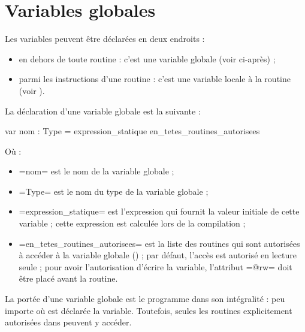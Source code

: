 




\chapter{Variables globales}

Les variables peuvent être déclarées en deux endroits :
\begin{itemize}
  \item en dehors de toute routine : c'est une variable globale (voir ci-après) ;
  \item parmi les instructions d'une routine : c'est une variable locale à la routine (voir ).
\end{itemize}






La déclaration d'une variable globale est la suivante :

\begin{PLM}
var nom : Type = expression_statique {
  en_tetes_routines_autorisees
}
\end{PLM}

Où :
\begin{itemize}
  \item \plm=nom= est le nom de la variable globale ;
  \item \plm=Type= est le nom du type de la variable globale ;
  \item \plm=expression_statique= est l'expression qui fournit la valeur initiale de cette variable ; cette expression est calculée lors de la compilation ;
  \item \plm=en_tetes_routines_autorisees= est la liste des routines qui sont autorisées à accéder à la variable globale () ; par défaut, l'accès est autorisé en lecture seule ; pour avoir l'autorisation d'écrire la variable, l'attribut \plm=@rw= doit être placé avant la routine.
\end{itemize}

La portée d'une variable globale est le programme dans son intégralité : peu importe où est déclarée la variable. Toutefois, seules les routines explicitement autorisées dans peuvent y accéder.

